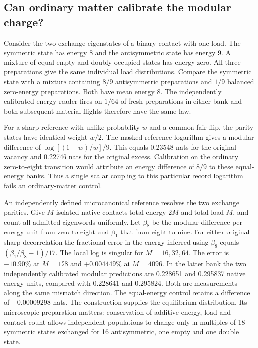\documentclass[11pt]{article}
\begin{document}
\subsection{Can ordinary matter calibrate the modular charge?}

Consider the two exchange eigenstates of a binary contact with one
load. The symmetric state has energy 8 and the antisymmetric state has
energy 9. A mixture of equal empty and doubly occupied states has
energy zero. All three preparations give the same individual load
distributions. Compare the symmetric state with a mixture containing
$8/9$ antisymmetric preparations and $1/9$ balanced zero-energy
preparations. Both have mean energy 8. The independently calibrated
energy reader fires on $1/64$ of fresh preparations in either bank and
both subsequent material flights therefore have the same law.

For a sharp reference with unlike probability $w$ and a common fair
flip, the parity states have identical weight $w/2$. The masked
reference logarithm gives a modular difference of
$\log[(1-w)/w]/9$. This equals 0.23548 nats for the original vacancy
and 0.22746 nats for the original excess. Calibration on the ordinary
zero-to-eight transition would attribute an energy difference of
$8/9$ to these equal-energy banks. Thus a single scalar coupling to
this particular record logarithm fails an ordinary-matter control.

An independently defined microcanonical reference resolves the two
exchange parities. Give $M$ isolated native contacts total energy
$2M$ and total load $M$, and count all admitted eigenwords uniformly.
Let $\beta_8$ be the modular difference per energy unit from zero to
eight and $\beta_1$ that from eight to nine. For either original sharp
decorrelation the fractional error in the energy inferred using
$\beta_8$ equals $(\beta_1/\beta_8-1)/17$. The local log is singular
for $M=16,32,64$. The error is $-10.90\%$ at $M=128$ and
$+0.004449\%$ at $M=4096$. In the latter bank the two independently
calibrated modular predictions are 0.228651 and 0.295837 native
energy units, compared with 0.228641 and 0.295824. Both are
measurements along the same mismatch direction. The equal-energy
control retains a difference of $-0.00009298$ nats. The construction
supplies the equilibrium distribution. Its microscopic preparation
matters: conservation of additive energy, load and contact count
allows independent populations to change only in multiples of
18 symmetric states exchanged for 16 antisymmetric, one empty and
one double state.
\end{document}
